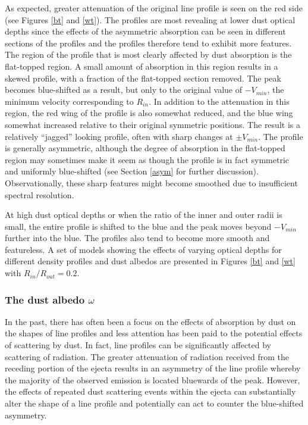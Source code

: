 \documentclass[useAMS,usenatbib,usegraphicx]{mnras}
\begin{document}
As expected, greater attenuation of the original line profile is seen on 
the red side (see Figures \ref{bt} and \ref{wt}).  The profiles are most revealing at lower 
dust optical depths since the effects of the asymmetric absorption can be seen in 
different sections of the profiles and the profiles therefore tend to exhibit more features.
  The region of the profile that is 
most clearly affected by dust absorption is the flat-topped region.  A 
small amount of absorption in this region results in a skewed profile, 
with a fraction of the flat-topped section removed.  The peak becomes 
blue-shifted as a result, but only to the original value of $-V_{min}$, the minimum 
velocity corresponding to $R_{in}$. In addition to the attenuation in this region, 
the red wing of the profile is also somewhat reduced, and the blue wing 
somewhat increased relative to their original symmetric positions.  The 
result is a relatively ``jagged'' looking profile, often with sharp changes 
at $\pm V_{min}$.  The profile is generally asymmetric, although the 
degree of absorption in the flat-topped region may sometimes make it seem 
as though the profile is in fact symmetric and uniformly blue-shifted (see 
Section \ref{asym} for further discussion).  Observationally, these sharp features might become smoothed due to insufficient spectral resolution.

At high dust optical depths or when the ratio of the inner and outer radii is small, the entire profile is shifted to the blue and the 
peak moves beyond $-V_{min}$ further into the blue.  The 
profiles also tend to become more smooth and featureless.  A set of models showing 
the effects of varying optical depths for different density profiles and 
dust albedos are presented in Figures \ref{bt} and \ref{wt} with $R_{in}/R_{out} = 0.2$.



\subsubsection{The dust albedo $\omega$}
\label{omega}



In the past, there has often been a focus on the effects of absorption by dust 
on the shapes of line profiles and less attention has been paid to the 
potential effects of scattering by dust.  In fact, line profiles 
can be significantly affected by scattering of radiation.  
The greater attenuation of radiation received from the receding portion of 
the ejecta results in an asymmetry of the line profile whereby the 
majority of the observed emission is located bluewards of the peak.  
However, the effects of repeated dust scattering events within the 
ejecta can substantially alter the shape of a line profile and potentially can act to counter the blue-shifted asymmetry.  
\end{document}
